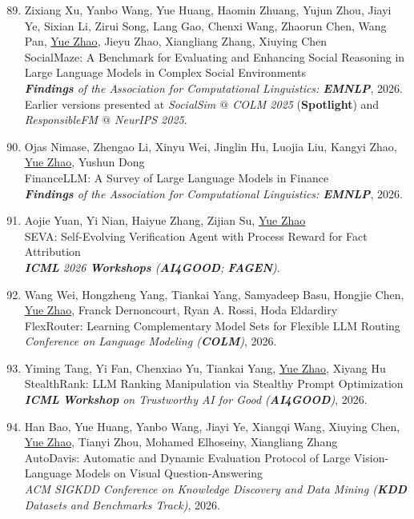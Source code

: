 \documentclass[margin,line,pifont,palatino,courier]{res}
\newenvironment{benumerate}[1]{
    \let\oldItem\item
    \def\item{\addtocounter{enumi}{-2}\oldItem}
    \begin{enumerate}[leftmargin=0.25in,label=\textcolor{uscred}{\arabic*.}]
    \setcounter{enumi}{#1}
    \addtocounter{enumi}{1}
}{
    \end{enumerate}
}
\begin{document}
\begin{resume}
\begin{benumerate}{88}
    \item
    Zixiang Xu, Yanbo Wang, Yue Huang, Haomin Zhuang, Yujun Zhou, Jiayi Ye, Sixian Li, Zirui Song, Lang Gao, Chenxi Wang, Zhaorun Chen, Wang Pan, \underline{Yue Zhao}, Jieyu Zhao, Xiangliang Zhang, Xiuying Chen\\
    SocialMaze: A Benchmark for Evaluating and Enhancing Social Reasoning in Large Language Models in Complex Social Environments\\
    \textit{\textbf{Findings} of the Association for Computational Linguistics: \textbf{EMNLP}}, 2026.
    Earlier versions presented at \textit{SocialSim $@$ COLM 2025} (\textbf{Spotlight}) and \textit{ResponsibleFM $@$ NeurIPS 2025}.

    \item
    Ojas Nimase, Zhengao Li, Xinyu Wei, Jinglin Hu, Luojia Liu, Kangyi Zhao, \underline{Yue Zhao}, Yushun Dong\\
    FinanceLLM: A Survey of Large Language Models in Finance\\
    \textit{\textbf{Findings} of the Association for Computational Linguistics: \textbf{EMNLP}}, 2026.

    \item
    Aojie Yuan, Yi Nian, Haiyue Zhang, Zijian Su, \underline{Yue Zhao}\\
    SEVA: Self-Evolving Verification Agent with Process Reward for Fact Attribution\\
    \textit{\textbf{ICML} 2026 \textbf{Workshops} (\textbf{AI4GOOD}; \textbf{FAGEN})}.

    \item
    Wang Wei, Hongzheng Yang, Tiankai Yang, Samyadeep Basu, Hongjie Chen, \underline{Yue Zhao}, Franck Dernoncourt, Ryan A. Rossi, Hoda Eldardiry\\
    FlexRouter: Learning Complementary Model Sets for Flexible LLM Routing\\
    \textit{Conference on Language Modeling (\textbf{COLM})}, 2026.

    \item Yiming Tang, Yi Fan, Chenxiao Yu, Tiankai Yang, \underline{Yue Zhao}, Xiyang Hu\\
    StealthRank: LLM Ranking Manipulation via Stealthy Prompt Optimization\\
    \textit{\textbf{ICML} \textbf{Workshop} on Trustworthy AI for Good (\textbf{AI4GOOD})}, 2026.

    \item
    Han Bao, Yue Huang, Yanbo Wang, Jiayi Ye, Xiangqi Wang, Xiuying Chen, \underline{Yue Zhao}, Tianyi Zhou, Mohamed Elhoseiny, Xiangliang Zhang\\
    AutoDavis: Automatic and Dynamic Evaluation Protocol of Large Vision-Language Models on Visual Question-Answering\\
    \textit{ACM SIGKDD Conference on Knowledge Discovery and Data Mining (\textbf{KDD} Datasets and Benchmarks Track)}, 2026.


\end{benumerate}
\end{resume}
\end{document}
